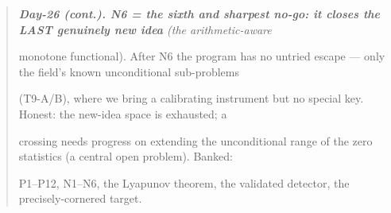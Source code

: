 \documentclass[10pt]{article}
\begin{document}
\begin{quote}\itshape
\textbf{Day-26 (cont.). N6 = the sixth and sharpest no-go: it closes the LAST genuinely new idea} (the arithmetic-aware\par
monotone functional). After N6 the program has no untried escape --- only the field's known unconditional sub-problems\par
(T9-A/B), where we bring a calibrating instrument but no special key. Honest: the new-idea space is exhausted; a\par
crossing needs progress on extending the unconditional range of the zero statistics (a central open problem). Banked:\par
P1--P12, N1--N6, the Lyapunov theorem, the validated detector, the precisely-cornered target.\par
\end{quote}
\end{document}

